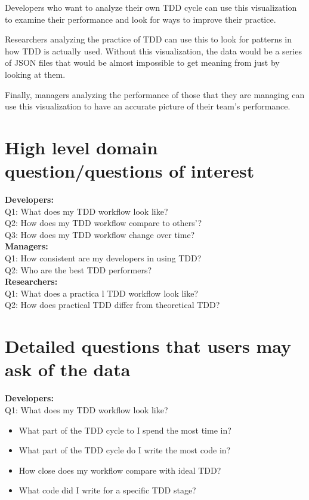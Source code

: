 \documentclass[journal]{vgtc}                %
\begin{document}
Developers who want to analyze their own TDD cycle can use this visualization to examine their performance and look for ways to improve their practice.

Researchers analyzing the practice of TDD can use this to look for patterns in how TDD is actually used.  Without this visualization, the data would be a series of JSON files that would be almost impossible to get meaning from just by looking at them.  

Finally, managers analyzing the performance of those that they are managing can use this visualization to have an accurate picture of their team's performance.

\section{High level domain question/questions of interest}
\label{sec:highq}

\textbf{Developers:} \\
Q1: What does my TDD workflow look like? \\
Q2: How does my TDD workflow compare to others'? \\
Q3: How does my TDD workflow change over time? \\

\textbf{Managers:} \\
Q1: How consistent are my developers in using TDD? \\
Q2: Who are the best TDD performers? \\

\textbf{Researchers:} \\
Q1: What does a practica l TDD workflow look like? \\
Q2: How does practical TDD differ from theoretical TDD? \\

\section{Detailed questions that users may ask of the data}

\textbf{Developers:} \\
Q1: What does my TDD workflow look like? 
\begin{itemize}
	\item What part of the TDD cycle to I spend the most time in?
	\item What part of the TDD cycle do I write the most code in?
	\item How close does my workflow compare with ideal TDD?
	\item What code did I write for a specific TDD stage?
\end{itemize}
\end{document}

